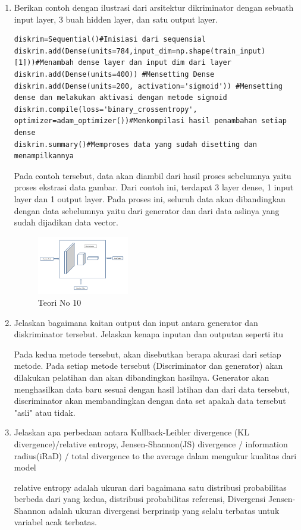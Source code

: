 \begin{enumerate}
            \item Berikan contoh dengan ilustrasi dari arsitektur dikriminator dengan sebuath input layer, 3 buah hidden layer, dan satu output layer.
\begin{verbatim}
diskrim=Sequential()#Inisiasi dari sequensial
diskrim.add(Dense(units=784,input_dim=np.shape(train_input)[1]))#Menambah dense layer dan input dim dari layer
diskrim.add(Dense(units=400)) #Mensetting Dense
diskrim.add(Dense(units=200, activation='sigmoid')) #Mensetting dense dan melakukan aktivasi dengan metode sigmoid
diskrim.compile(loss='binary_crossentropy', optimizer=adam_optimizer())#Menkompilasi hasil penambahan setiap dense
diskrim.summary()#Memproses data yang sudah disetting dan menampilkannya
\end{verbatim}
            \par Pada contoh tersebut, data akan diambil dari hasil proses sebelumnya yaitu proses ekstrasi data gambar. Dari contoh ini, terdapat 3 layer dense, 1 input layer dan 1 output layer. Pada proses ini, seluruh data akan dibandingkan dengan data sebelumnya yaitu dari generator dan dari data aslinya yang sudah dijadikan data vector. 
            \begin{figure}[H]
                \includegraphics[width=4cm]{figures/1174040/chapter8/teori10.png}
                \centering
                  \caption{Teori No 10}
            \end{figure}
            
            \item Jelaskan bagaimana kaitan output dan input antara generator dan diskriminator tersebut. Jelaskan kenapa inputan dan outputan seperti itu
            \par Pada kedua metode tersebut, akan disebutkan berapa akurasi dari setiap metode. Pada setiap metode tersebut (Discriminator dan generator) akan dilakukan pelatihan dan akan dibandingkan hasilnya. Generator akan menghasilkan data baru sesuai dengan hasil latihan dan dari data tersebut, discriminator akan membandingkan dengan data set apakah data tersebut "asli" atau tidak.
            
            \item Jelaskan apa perbedaan antara Kullback-Leibler divergence (KL divergence)/relative entropy, Jensen-Shannon(JS) divergence / information radius(iRaD) / total divergence to the average dalam mengukur kualitas dari model
            \par relative entropy adalah ukuran dari bagaimana satu distribusi probabilitas berbeda dari yang kedua, distribusi probabilitas referensi, Divergensi Jensen-Shannon adalah ukuran divergensi berprinsip yang selalu terbatas untuk variabel acak terbatas.


\end{enumerate}
